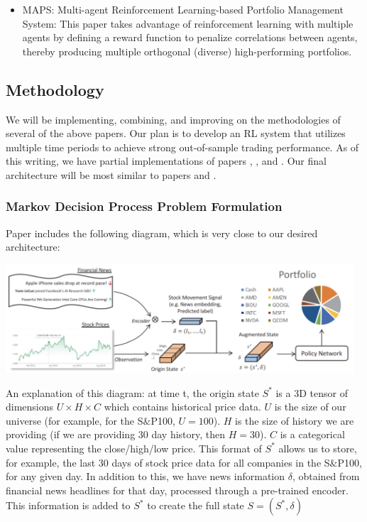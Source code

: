 \begin{itemize}
\item \cite{maps} MAPS: Multi-agent Reinforcement Learning-based Portfolio Management System: 
This paper takes advantage of reinforcement learning with multiple agents by defining a 
reward function to penalize correlations between agents, thereby producing multiple orthogonal 
(diverse) high-performing portfolios.

\end{itemize}

\subsection{Methodology}

We will be implementing, combining, and improving on the methodologies of several of the above papers. 
Our plan is to develop an RL system that utilizes multiple time periods to achieve strong out-of-sample 
trading performance. As of this writing, we have partial implementations of papers \cite{drl_mvo}, \cite{drl_modern_portfolio_theory}, and \cite{drl_framework}.
 Our final architecture will be most similar to papers \cite{rl_augmented_states} and \cite{drl_framework}.

\subsubsection{Markov Decision Process Problem Formulation}

Paper \cite{rl_augmented_states} includes the following diagram, which is very close to our desired 
architecture:

\includegraphics[width=13cm]{formulation.png}

An explanation of this diagram: at time t, the origin state $S^*$ is a 3D tensor of dimensions $U \times H \times C$
which contains historical price data. $U$ is the size of our universe (for example, for the S$\&$P100, $U = 100$). 
$H$ is the size of history we are providing (if we are providing 30 day history, then $H = 30$). 
$C$ is a categorical value representing the close/high/low price. This format of $S^*$ allows us to store, 
for example, the last 30 days of stock price data for all companies in the S$\&$P100, for any given day. 
In addition to this, we have news information $\delta$, obtained from financial news headlines for that day, 
processed through a pre-trained encoder. This information is added to $S^*$ to create the full state 
$S = (S^*, \delta)$

